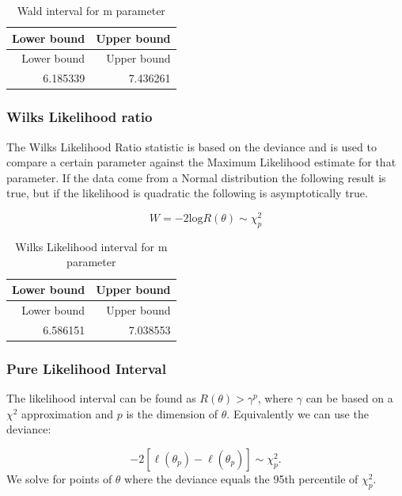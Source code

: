 \documentclass[11pt,preprint, authoryear]{elsarticle}
\numberwithin{equation}{section}
\numberwithin{figure}{section}
\numberwithin{table}{section}
\begin{document}
\begin{longtable}[]{@{}rr@{}}
\caption{Wald interval for m parameter}\tabularnewline
\toprule
Lower bound & Upper bound\tabularnewline
\midrule
\endfirsthead
\toprule
Lower bound & Upper bound\tabularnewline
\midrule
\endhead
6.185339 & 7.436261\tabularnewline
\bottomrule
\end{longtable}

\subsubsection{Wilks Likelihood ratio}\label{wilks-likelihood-ratio}

The Wilks Likelihood Ratio statistic is based on the deviance and is
used to compare a certain parameter against the Maximum Likelihood
estimate for that parameter. If the data come from a Normal distribution
the following result is true, but if the likelihood is quadratic the
following is asymptotically true.

\[W = -2\text{log}R(\theta) \sim \chi^2_p\]

\begin{longtable}[]{@{}rr@{}}
\caption{Wilks Likelihood interval for m parameter}\tabularnewline
\toprule
Lower bound & Upper bound\tabularnewline
\midrule
\endfirsthead
\toprule
Lower bound & Upper bound\tabularnewline
\midrule
\endhead
6.586151 & 7.038553\tabularnewline
\bottomrule
\end{longtable}

\subsubsection{Pure Likelihood Interval}\label{pure-likelihood-interval}

The likelihood interval can be found as \(R(\theta) > \gamma^p\), where
\(\gamma\) can be based on a \(\chi^2\) approximation and \(p\) is the
dimension of \(\theta\). Equivalently we can use the deviance:

\[ -2[\ell(\theta_p) - \ell(\hat{\theta_p})] \sim \chi^2_p. \] We solve
for points of \(\theta\) where the deviance equals the 95th percentile
of \(\chi^2_p\).
\end{document}
